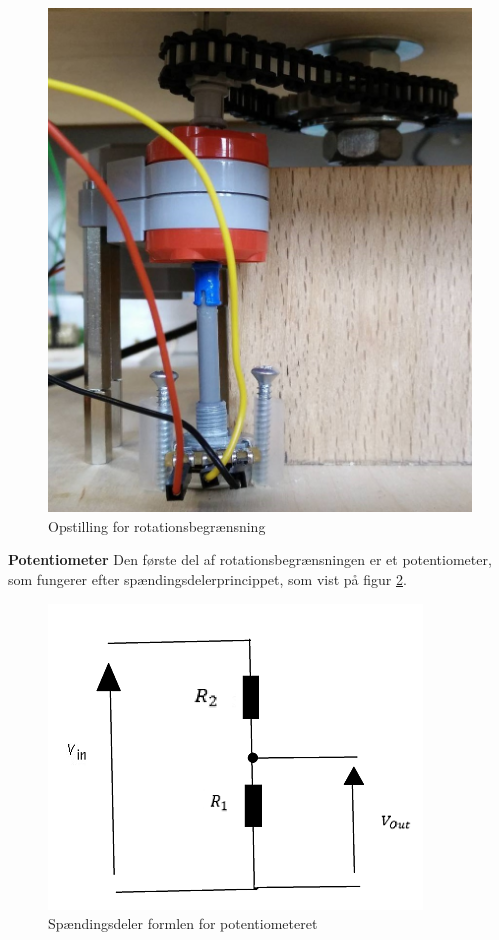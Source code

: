 \begin{figure}[H]
	\centering
	\includegraphics[scale=0.3]{Afsnit/DesignOgImplementering/images/potentiometerADC}
	\caption{Opstilling for rotationsbegrænsning}
	\label{fig:opstillingADC}
\end{figure}

\noindent \textbf{Potentiometer} \newline
\noindent Den første del af rotationsbegrænsningen er et potentiometer, som fungerer efter spændingsdelerprincippet, som vist på figur \ref{fig:potentiometer2}.

\begin{figure}[H]
	\centering
	\includegraphics[scale=0.65]{DesignOgImplementering/images/potentiometer}
	\caption{Spændingsdeler formlen for potentiometeret}
	\label{fig:potentiometer2}
\end{figure}


